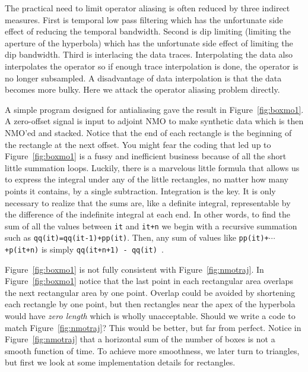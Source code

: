 \par
The practical need to limit operator aliasing
is often reduced by three indirect measures.
First is temporal low pass filtering
which has the unfortunate side effect
of reducing the temporal bandwidth.
Second is dip limiting (limiting the aperture of the hyperbola)
which has the unfortunate side effect of limiting the dip bandwidth.
Third is interlacing the data traces.
Interpolating the data also interpolates the operator
so if enough trace interpolation is done, the operator is no longer subsampled.
A disadvantage of data interpolation is that the data becomes more bulky.
Here we attack the operator aliasing problem directly.

\par
A simple program designed for antialiasing
gave the result in Figure~\ref{fig:boxmo1}.
A zero-offset signal is input to adjoint NMO to make
synthetic data which is then NMO'ed and stacked.
Notice that the end of each rectangle
is the beginning of the rectangle at the next offset. %
You might fear the coding that led up to Figure~\ref{fig:boxmo1}
is a fussy and inefficient business
because of all the short little summation loops.
Luckily, there is a marvelous little formula that allows
us to express the integral under any of the little rectangles,
no matter how many points it contains,
by a single subtraction.
Integration is the key.
It is only necessary to realize that the sums are,
like a definite integral,
representable by the difference of the indefinite integral at each end.
In other words, to find the sum of all the values between
{\tt it} and {\tt it+n} we begin with
a recursive summation such as {\tt qq(it)=qq(it-1)+pp(it)}.
Then, any sum of values like {\tt pp(it)+$\cdots $+p(it+n)} is simply
{\tt qq(it+n+1) - qq(it) }.

\par
Figure~\ref{fig:boxmo1} is not fully consistent with Figure~\ref{fig:nmotraj}.
In Figure~\ref{fig:boxmo1} notice that the last point in each rectangular area
overlaps the next rectangular area by one point.
Overlap could be avoided by shortening each rectangle by one point,
but then rectangles near the apex of the hyperbola
would have {\em  zero length} which is wholly unacceptable.
Should we write a code to match Figure~\ref{fig:nmotraj}?
This would be better, but far from perfect.
Notice in Figure~\ref{fig:nmotraj} that a horizontal sum of the number of boxes
is not a smooth function of time.
To achieve more smoothness, we later turn to triangles,
but first we look at some implementation details for rectangles.

